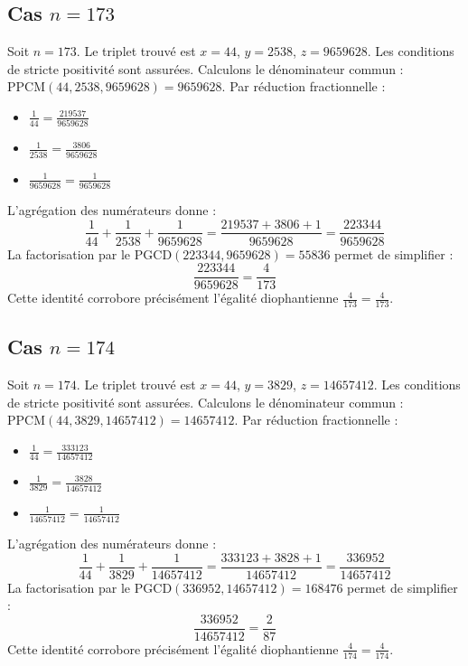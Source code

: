 \documentclass[11pt,a4paper]{article}
\begin{document}
\subsection{Cas $n = 173$}
Soit $n = 173$. Le triplet trouvé est $x = 44$, $y = 2538$, $z = 9659628$.
Les conditions de stricte positivité sont assurées.
Calculons le dénominateur commun : $\text{PPCM}(44, 2538, 9659628) = 9659628$.
Par réduction fractionnelle :
\begin{itemize}
    \item $\frac{1}{44} = \frac{219537}{9659628}$
    \item $\frac{1}{2538} = \frac{3806}{9659628}$
    \item $\frac{1}{9659628} = \frac{1}{9659628}$
\end{itemize}
L'agrégation des numérateurs donne :
$$ \frac{1}{44} + \frac{1}{2538} + \frac{1}{9659628} = \frac{219537 + 3806 + 1}{9659628} = \frac{223344}{9659628} $$
La factorisation par le $\text{PGCD}(223344, 9659628) = 55836$ permet de simplifier :
$$ \frac{223344}{9659628} = \frac{4}{173} $$
Cette identité corrobore précisément l'égalité diophantienne $\frac{4}{173} = \frac{4}{173}$.

\subsection{Cas $n = 174$}
Soit $n = 174$. Le triplet trouvé est $x = 44$, $y = 3829$, $z = 14657412$.
Les conditions de stricte positivité sont assurées.
Calculons le dénominateur commun : $\text{PPCM}(44, 3829, 14657412) = 14657412$.
Par réduction fractionnelle :
\begin{itemize}
    \item $\frac{1}{44} = \frac{333123}{14657412}$
    \item $\frac{1}{3829} = \frac{3828}{14657412}$
    \item $\frac{1}{14657412} = \frac{1}{14657412}$
\end{itemize}
L'agrégation des numérateurs donne :
$$ \frac{1}{44} + \frac{1}{3829} + \frac{1}{14657412} = \frac{333123 + 3828 + 1}{14657412} = \frac{336952}{14657412} $$
La factorisation par le $\text{PGCD}(336952, 14657412) = 168476$ permet de simplifier :
$$ \frac{336952}{14657412} = \frac{2}{87} $$
Cette identité corrobore précisément l'égalité diophantienne $\frac{4}{174} = \frac{4}{174}$.
\end{document}
